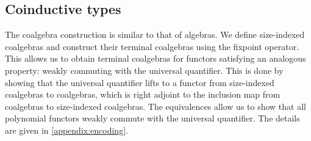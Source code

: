 \subsection{Coinductive types}
The coalgebra construction is similar to that of algebras. We define size-indexed coalgebras and construct their terminal coalgebras using the fixpoint operator. This allows us to obtain terminal coalgebras for functors satisfying an analogous property: weakly commuting with the universal quantifier. This is done by showing that the universal quantifier lifts to a functor from size-indexed coalgebras to coalgebras, which is right adjoint to the inclusion map from coalgebras to size-indexed coalgebras. 
The equivalences allow us to show that all polynomial functors weakly commute with the universal quantifier.
The details are given in \autoref{appendix:encoding}.

